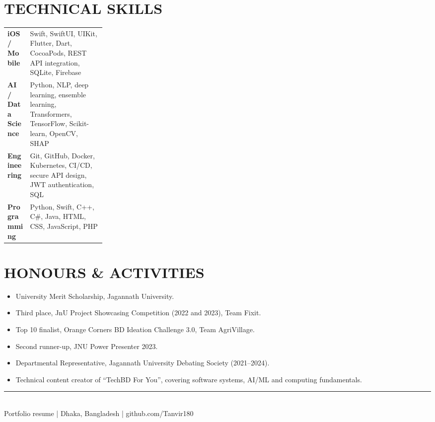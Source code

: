 \documentclass[a4paper,10pt]{article}
\begin{document}
\section{TECHNICAL SKILLS}
\begin{tabularx}{\linewidth}{@{}p{0.23\linewidth}X@{}}
\textbf{\color{navy}iOS / Mobile} & Swift, SwiftUI, UIKit, Flutter, Dart, CocoaPods, REST API integration, SQLite, Firebase\\[5pt]
\textbf{\color{navy}AI / Data Science} & Python, NLP, deep learning, ensemble learning, Transformers, TensorFlow, Scikit-learn, OpenCV, SHAP\\[5pt]
\textbf{\color{navy}Engineering} & Git, GitHub, Docker, Kubernetes, CI/CD, secure API design, JWT authentication, SQL\\[5pt]
\textbf{\color{navy}Programming} & Python, Swift, C++, C\#, Java, HTML, CSS, JavaScript, PHP\\
\end{tabularx}

\section{HONOURS \& ACTIVITIES}
\begin{itemize}
\item University Merit Scholarship, Jagannath University.
\item Third place, JnU Project Showcasing Competition (2022 and 2023), Team Fixit.
\item Top 10 finalist, Orange Corners BD Ideation Challenge 3.0, Team AgriVillage.
\item Second runner-up, JNU Power Presenter 2023.
\item Departmental Representative, Jagannath University Debating Society (2021--2024).
\item Technical content creator of ``TechBD For You'', covering software systems, AI/ML and computing fundamentals.
\end{itemize}

\vfill
{\color{linecolor}\rule{\linewidth}{0.6pt}}\\[-1pt]
{\small\color{textgray}Portfolio resume  |  Dhaka, Bangladesh  |  github.com/Tanvir180}
\end{document}
